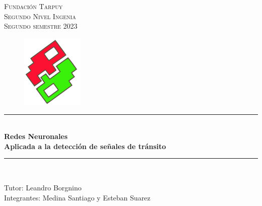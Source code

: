 \documentclass[13pt, letterpaper, oneside]{article}
\begin{document}

	\begin{titlepage}
	\newcommand{\HRule}{\rule{\linewidth}{0.5mm}}
	\center %
	\vspace*{4cm}
	\textsc{\Huge Fundación Tarpuy}\\[0.3cm]
	\textsc{\Large Segundo Nivel Ingenia}\\[0.2cm]
	\textsc{Segundo semestre 2023}\\[0.3cm]
	\begin{figure}[ht]
		\centering
		\includegraphics[height=3.5cm]{2}
	\end{figure}

	\HRule \\[0.8cm]
	{ \huge \bfseries Redes Neuronales}\\[0.4cm] %
	{ \large \bfseries Aplicada a la detección de señales de tránsito}\\[0.2cm]
	\HRule \\[1.0cm]
 

	\begin{minipage}{0.8\textwidth}
		\begin{center} \large
			Tutor: Leandro Borgnino \\[0.5cm]
			Integrantes: Medina Santiago y Esteban Suarez
		\end{center}
	\end{minipage}

	\vspace{1cm}
	\end{titlepage}

	\tableofcontents
	\pagebreak

	
\end{document}
